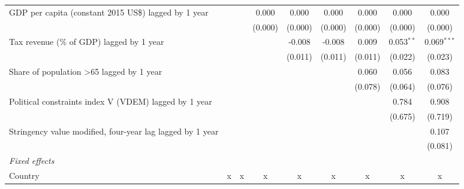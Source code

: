 \begin{tabular}{lcccccccc}
   GDP per capita (constant 2015 US\$) lagged by 1 year         &               &               & 0.000         & 0.000         & 0.000         & 0.000          & 0.000          & 0.000\\   
                                                                &               &               & (0.000)       & (0.000)       & (0.000)       & (0.000)        & (0.000)        & (0.000)\\   
   Tax revenue (\% of GDP) lagged by 1 year                     &               &               &               & -0.008        & -0.008        & 0.009          & 0.053$^{**}$   & 0.069$^{***}$\\   
                                                                &               &               &               & (0.011)       & (0.011)       & (0.011)        & (0.022)        & (0.023)\\   
   Share of population >65 lagged by 1 year                     &               &               &               &               &               & 0.060          & 0.056          & 0.083\\   
                                                                &               &               &               &               &               & (0.078)        & (0.064)        & (0.076)\\   
   Political constraints index V (VDEM) lagged by 1 year        &               &               &               &               &               &                & 0.784          & 0.908\\   
                                                                &               &               &               &               &               &                & (0.675)        & (0.719)\\   
   Stringency value modified, four-year lag lagged by 1 year    &               &               &               &               &               &                &                & 0.107\\   
                                                                &               &               &               &               &               &                &                & (0.081)\\   
   \emph{Fixed effects}\\
   Country                                                      & x             & x             & x             & x             & x             & x              & x              & x\\  

\end{tabular}

